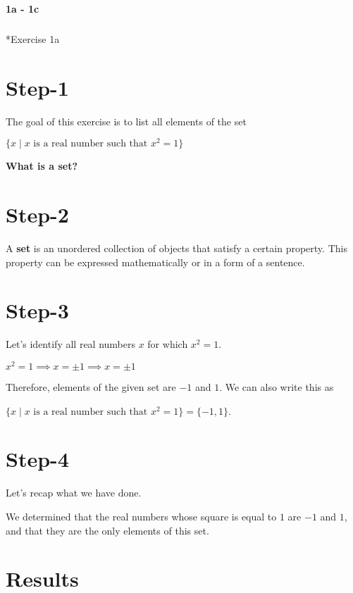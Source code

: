 \documentclass[
  letterpaper,
  DIV=11,
  numbers=noendperiod]{scrreprt}
\makeatletter
\let\oldsubparagraph\subparagraph
\renewcommand{\subparagraph}{
    \@ifstar
      \xxxSubParagraphStar
      \xxxSubParagraphNoStar
  }
\newcommand{\xxxSubParagraphStar}[1]{\oldsubparagraph*{#1}\mbox{}}
\newcommand{\xxxSubParagraphNoStar}[1]{\oldsubparagraph{#1}\mbox{}}
\makeatother
\begin{document}
\begin{tcolorbox}[enhanced jigsaw, colframe=quarto-callout-note-color-frame, toprule=.15mm, bottomrule=.15mm, rightrule=.15mm, colback=white, breakable, arc=.35mm, opacityback=0, left=2mm, leftrule=.75mm]

\vspace{-3mm}\textbf{1a - 1c}\vspace{3mm}

\subparagraph*{Exercise 1a}\label{exercise-1a}

\section{Step-1}

The goal of this exercise is to list all elements of the set

\(\{x∣x \text{ is a real number such that } x^2=1\}\)

\textbf{What is a set?}

\section{Step-2}

A \textbf{set} is an unordered collection of objects that satisfy a
certain property. This property can be expressed mathematically or in a
form of a sentence.

\section{Step-3}

Let's identify all real numbers \(x\) for which \(x^2=1\).

\(x^2 = 1 ⟹ x = ± 1 ⟹ x = ± 1\)

Therefore, elements of the given set are \(−1\) and \(1\). We can also
write this as

\(\{x∣x \text{ is a real number such that } x^2=1\} = \{-1, 1\}\).

\section{Step-4}

Let's recap what we have done.

We determined that the real numbers whose square is equal to \(1\) are
\(−1\) and \(1\), and that they are the only elements of this set.

\section{Results}


\end{tcolorbox}
\end{document}
